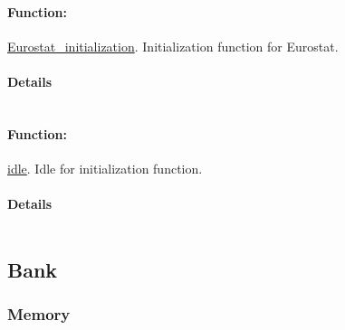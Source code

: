 \documentclass[a4paper,11pt]{article}
\begin{document}
\paragraph{Function:}\url{Eurostat_initialization}.
Initialization function for Eurostat.
\paragraph{Details}
\begin{verbatim}
\end{verbatim}
\paragraph{Function:}\url{idle}.
Idle for initialization function.
\paragraph{Details}
\begin{verbatim}
\end{verbatim}
\subsection{Bank}

\subsubsection{Memory}
\end{document}
